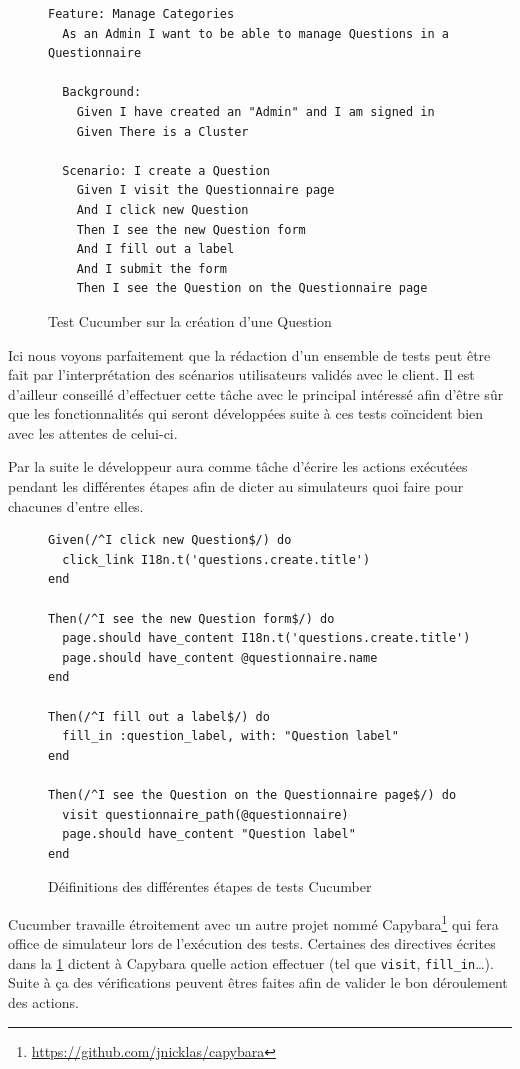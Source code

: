 \documentclass[12pt,a4paper]{book}
\begin{document}
\begin{figure}[h]
\lstset{language=ruby}
\begin{lstlisting}
Feature: Manage Categories
  As an Admin I want to be able to manage Questions in a Questionnaire

  Background:
    Given I have created an "Admin" and I am signed in
    Given There is a Cluster

  Scenario: I create a Question
    Given I visit the Questionnaire page
    And I click new Question
    Then I see the new Question form
    And I fill out a label
    And I submit the form
    Then I see the Question on the Questionnaire page
\end{lstlisting}
 \caption{Test Cucumber sur la création d'une Question}
\end{figure}

Ici nous voyons parfaitement que la rédaction d'un ensemble de tests peut être fait par l'interprétation des scénarios utilisateurs validés avec le client. Il est d'ailleur conseillé d'effectuer cette tâche avec le principal intéressé afin d'être sûr que les fonctionnalités qui seront développées suite à ces tests coïncident bien avec les attentes de celui-ci.

Par la suite le développeur aura comme tâche d'écrire les actions exécutées pendant les différentes étapes afin de dicter au simulateurs quoi faire pour chacunes d'entre elles.

\begin{figure}[h]
\lstset{language=ruby}
\begin{lstlisting}
Given(/^I click new Question$/) do
  click_link I18n.t('questions.create.title')
end

Then(/^I see the new Question form$/) do
  page.should have_content I18n.t('questions.create.title')
  page.should have_content @questionnaire.name
end

Then(/^I fill out a label$/) do
  fill_in :question_label, with: "Question label"
end

Then(/^I see the Question on the Questionnaire page$/) do
  visit questionnaire_path(@questionnaire)
  page.should have_content "Question label"
end
\end{lstlisting}
 \caption{Déifinitions des différentes étapes de tests Cucumber}
 \label{fig.cucumber2}
\end{figure}

Cucumber travaille étroitement avec un autre projet nommé Capybara\footnote{\url{https://github.com/jnicklas/capybara}} qui fera office de simulateur lors de l'exécution des tests. Certaines des directives écrites dans la \cref{fig.cucumber2} dictent à Capybara quelle action effectuer (tel que \texttt{visit}, \texttt{fill\_in}\dots). Suite à ça des vérifications peuvent êtres faites afin de valider le bon déroulement des actions. 
\end{document}
